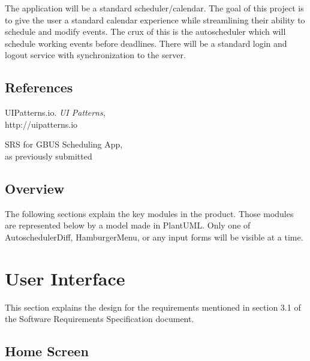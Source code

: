 \documentclass{scrreprt}
\begin{document}
The application will be a standard scheduler/calendar. The goal of this project is to give the user a standard calendar experience while streamlining their ability to schedule and modify events. The crux of this is the autoscheduler which will schedule working events before deadlines. There will be a standard login and logout service with synchronization to the server.

\section{References}

UIPatterns.io. \textit{UI Patterns},\\
http://uipatterns.io

SRS for GBUS Scheduling App,\\
as previously submitted

\section{Overview}

The following sections explain the key modules in the product. Those modules are represented below by a model made in PlantUML. Only one of AutoschedulerDiff, HamburgerMenu, or any input forms will be visible at a time.

\chapter{User Interface}

This section explains the design for the requirements mentioned in section 3.1 of the Software Requirements Specification document.

\section{Home Screen}
\end{document}
